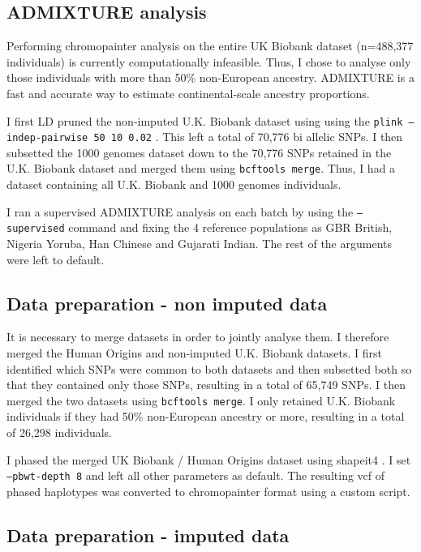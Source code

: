 \subsection{ADMIXTURE analysis}

Performing chromopainter analysis on the entire UK Biobank dataset (n=488,377 individuals) is currently computationally infeasible. Thus, I chose to analyse only those individuals with more than 50\% non-European ancestry. ADMIXTURE is a fast and accurate way to estimate continental-scale ancestry proportions.

I first LD pruned the non-imputed U.K. Biobank dataset using using the \texttt{plink --indep-pairwise 50 10 0.02} \cite{purcell2007plink}. This left a total of  70,776 bi allelic SNPs. I then subsetted the 1000 genomes dataset down to the 70,776 SNPs retained in the U.K. Biobank dataset and merged them using \texttt{bcftools merge}. Thus, I had a dataset containing all U.K. Biobank and 1000 genomes individuals. 

I ran a supervised ADMIXTURE analysis on each batch by using the \texttt{--supervised} command and fixing the 4 reference populations as GBR British, Nigeria Yoruba, Han Chinese and Gujarati Indian. The rest of the arguments were left to default.

\subsection{Data preparation - non imputed data}

It is necessary to merge datasets in order to jointly analyse them. I therefore merged the Human Origins and non-imputed U.K. Biobank datasets. I first identified which SNPs were common to both datasets and then subsetted both so that they contained only those SNPs, resulting in a total of 65,749 SNPs. I then merged the two datasets using \texttt{bcftools merge}. I only retained U.K. Biobank individuals if they had 50\% non-European ancestry or more, resulting in a total of 26,298 individuals. 

I phased the merged UK Biobank / Human Origins dataset using shapeit4 \cite{delaneau2018integrative}. I set \texttt{--pbwt-depth 8} and left all other parameters as default. The resulting vcf of phased haplotypes was converted to chromopainter format using a custom script.  

\subsection{Data preparation - imputed data}

